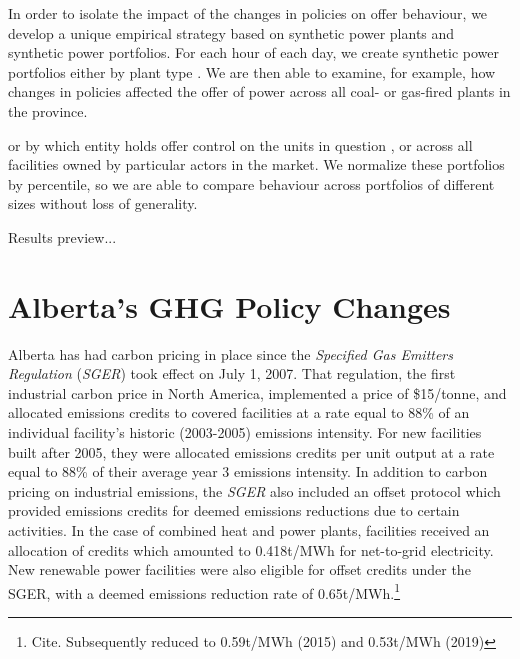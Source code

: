 \documentclass[12pt]{article}
\begin{document}
In order to isolate the impact of the changes in policies on offer behaviour, we develop a unique empirical strategy based on synthetic power plants and synthetic power portfolios.  For each hour of each day, we create synthetic power portfolios either by plant type .  We are then able to examine, for example, how changes in policies affected the offer of power across all coal- or gas-fired plants in the province.

or by which entity holds offer control on the units in question
, or across all facilities owned by particular actors in the market.  We normalize these portfolios by percentile, so we are able to compare behaviour across portfolios of different sizes without loss of generality.

Results preview...


\section{Alberta's GHG Policy Changes}

Alberta has had carbon pricing in place since the \emph{Specified Gas Emitters Regulation} (\emph{SGER}) took effect on July 1, 2007. That regulation, the first industrial carbon price in North America, implemented a price of \$15/tonne, and allocated emissions credits to covered facilities at a rate equal to 88\% of an individual facility's historic (2003-2005) emissions intensity. For new facilities built after 2005, they were allocated emissions credits per unit output at a rate equal to 88\% of their average year 3 emissions intensity. In addition to carbon pricing on industrial emissions, the \emph{SGER} also included an offset protocol which provided emissions credits for deemed emissions reductions due to certain activities. In the case of combined heat and power plants, facilities received an allocation of credits which amounted to 0.418t/MWh for net-to-grid electricity. New renewable power facilities were also eligible for offset credits under the SGER, with a deemed emissions reduction rate of 0.65t/MWh.\footnote{Cite. Subsequently reduced to 0.59t/MWh (2015) and 0.53t/MWh (2019)}
\end{document}
